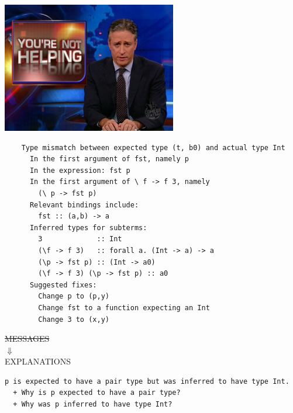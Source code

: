 \documentclass[xcolor=svgnames,12pt,aspectratio=169]{beamer}
\newenvironment{xframe}[1][]
  {\begin{frame}[fragile,environment=xframe,#1]}
  {\end{frame}}
\begin{document}
\begin{xframe}{}
  \begin{center}
    \includegraphics[width=3in]{not-helping.jpg}
  \end{center}
\end{xframe}

\begin{xframe}
  \footnotesize
  \begin{verbatim}
    Type mismatch between expected type (t, b0) and actual type Int
      In the first argument of fst, namely p
      In the expression: fst p
      In the first argument of \ f -> f 3, namely
        (\ p -> fst p)
      Relevant bindings include:
        fst :: (a,b) -> a
      Inferred types for subterms:
        3             :: Int
        (\f -> f 3)   :: forall a. (Int -> a) -> a
        (\p -> fst p) :: (Int -> a0)
        (\f -> f 3) (\p -> fst p) :: a0
      Suggested fixes:
        Change p to (p,y)
        Change fst to a function expecting an Int
        Change 3 to (x,y)
  \end{verbatim}
\end{xframe}

\begin{xframe}{}
  \Large
  \begin{center}
    \sout{MESSAGES} \\
    $\Downarrow$ \\
    EXPLANATIONS
  \end{center}
\end{xframe}

\begin{xframe}{}
  \small
\begin{verbatim}
p is expected to have a pair type but was inferred to have type Int.
  + Why is p expected to have a pair type?
  + Why was p inferred to have type Int?






\end{verbatim}
\end{xframe}
\end{document}
